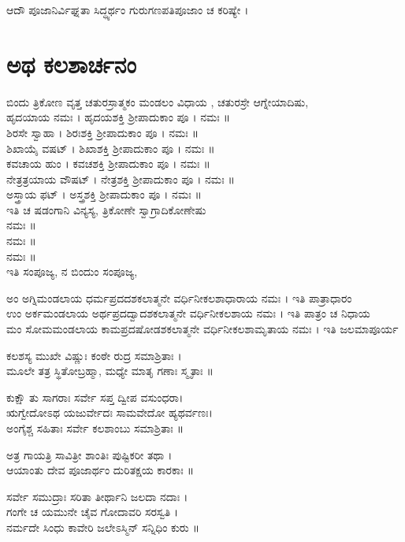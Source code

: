 ಆದೌ ಪೂಜಾನಿರ್ವಿಘ್ನತಾ ಸಿದ್ಧ್ಯರ್ಥಂ ಗುರುಗಣಪತಿಪೂಜಾಂ ಚ ಕರಿಷ್ಯೇ ।

\section{ಅಥ ಕಲಶಾರ್ಚನಂ}
ಬಿಂದು ತ್ರಿಕೋಣ ವೃತ್ತ ಚತುರಸ್ರಾತ್ಮಕಂ ಮಂಡಲಂ ವಿಧಾಯ , ಚತುರಸ್ರೇ ಆಗ್ನೇಯಾದಿಷು,\\
 ಹೃದಯಾಯ ನಮಃ । ಹೃದಯಶಕ್ತಿ ಶ್ರೀಪಾದುಕಾಂ ಪೂ । ನಮಃ ॥\\
 ಶಿರಸೇ ಸ್ವಾಹಾ । ಶಿರಃಶಕ್ತಿ ಶ್ರೀಪಾದುಕಾಂ ಪೂ । ನಮಃ ॥\\
 ಶಿಖಾಯೈ ವಷಟ್ । ಶಿಖಾಶಕ್ತಿ ಶ್ರೀಪಾದುಕಾಂ ಪೂ । ನಮಃ ॥\\
 ಕವಚಾಯ ಹುಂ । ಕವಚಶಕ್ತಿ ಶ್ರೀಪಾದುಕಾಂ ಪೂ । ನಮಃ ॥\\
 ನೇತ್ರತ್ರಯಾಯ ವೌಷಟ್ । ನೇತ್ರಶಕ್ತಿ ಶ್ರೀಪಾದುಕಾಂ ಪೂ । ನಮಃ ॥\\
 ಅಸ್ತ್ರಾಯ ಫಟ್ । ಅಸ್ತ್ರಶಕ್ತಿ ಶ್ರೀಪಾದುಕಾಂ ಪೂ । ನಮಃ ॥\\
ಇತಿ ಚ ಷಡಂಗಾನಿ ವಿನ್ಯಸ್ಯ, ತ್ರಿಕೋಣೇ ಸ್ವಾಗ್ರಾದಿಕೋಣೇಷು\\
 ನಮಃ ॥\\
 ನಮಃ ॥\\
 ನಮಃ ॥\\
ಇತಿ ಸಂಪೂಜ್ಯ, ನ ಬಿಂದುಂ ಸಂಪೂಜ್ಯ,

 ಅಂ ಅಗ್ನಿಮಂಡಲಾಯ ಧರ್ಮಪ್ರದದಶಕಲಾತ್ಮನೇ ವರ್ಧಿನೀಕಲಶಾಧಾರಾಯ ನಮಃ । ಇತಿ ಪಾತ್ರಾಧಾರಂ\\
 ಉಂ ಅರ್ಕಮಂಡಲಾಯ ಅರ್ಥಪ್ರದದ್ವಾದಶಕಲಾತ್ಮನೇ ವರ್ಧಿನೀಕಲಶಾಯ ನಮಃ । ಇತಿ ಪಾತ್ರಂ ಚ ನಿಧಾಯ\\
 ಮಂ ಸೋಮಮಂಡಲಾಯ ಕಾಮಪ್ರದಷೋಡಶಕಲಾತ್ಮನೇ ವರ್ಧಿನೀಕಲಶಾಮೃತಾಯ ನಮಃ । ಇತಿ ಜಲಮಾಪೂರ್ಯ

ಕಲಶಸ್ಯ ಮುಖೇ ವಿಷ್ಣುಃ ಕಂಠೇ ರುದ್ರ ಸಮಾಶ್ರಿತಾಃ  ।\\
ಮೂಲೇ ತತ್ರ ಸ್ಥಿತೋಬ್ರಹ್ಮಾ, ಮಧ್ಯೇ ಮಾತೃ ಗಣಾಃ ಸ್ಮೃತಾಃ ॥

ಕುಕ್ಷೌ ತು ಸಾಗರಾಃ ಸರ್ವೇ ಸಪ್ತ ದ್ವೀಪ ವಸುಂಧರಾ।\\
ಋಗ್ವೇದೋಽಥ ಯಜುರ್ವೇದಃ ಸಾಮವೇದೋ ಹ್ಯಥರ್ವಣಃ।\\
ಅಂಗೈಶ್ಚ ಸಹಿತಾಃ ಸರ್ವೇ ಕಲಶಾಂಬು ಸಮಾಶ್ರಿತಾಃ ॥

ಅತ್ರ ಗಾಯತ್ರಿ ಸಾವಿತ್ರೀ ಶಾಂತಿಃ ಪುಷ್ಟಿಕರೀ ತಥಾ ।\\
ಆಯಾಂತು ದೇವ ಪೂಜಾರ್ಥಂ ದುರಿತಕ್ಷಯ ಕಾರಕಾಃ ॥

ಸರ್ವೇ ಸಮುದ್ರಾಃ ಸರಿತಾ ತೀರ್ಥಾನಿ ಜಲದಾ ನದಾಃ ।\\
ಗಂಗೇ ಚ ಯಮುನೇ ಚೈವ ಗೋದಾವರಿ ಸರಸ್ವತಿ ।\\
ನರ್ಮದೇ ಸಿಂಧು ಕಾವೇರಿ ಜಲೇಽಸ್ಮಿನ್ ಸನ್ನಿಧಿಂ ಕುರು ॥


